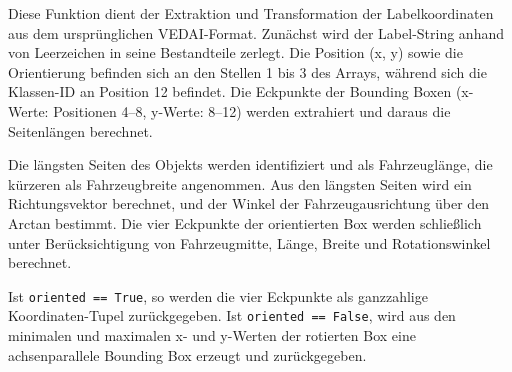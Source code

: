 Diese Funktion dient der Extraktion und Transformation der Labelkoordinaten aus dem ursprünglichen \acrshort{VEDAI}-Format. Zunächst wird der Label-String anhand von Leerzeichen in seine Bestandteile zerlegt. Die Position (x, y) sowie die Orientierung befinden sich an den Stellen 1 bis 3 des Arrays, während sich die Klassen-\acrshort{ID} an Position 12 befindet. Die Eckpunkte der Bounding Boxen (x-Werte: Positionen 4–8, y-Werte: 8–12) werden extrahiert und daraus die Seitenlängen berechnet.

Die längsten Seiten des Objekts werden identifiziert und als Fahrzeuglänge, die kürzeren als Fahrzeugbreite angenommen. Aus den längsten Seiten wird ein Richtungsvektor berechnet, und der Winkel der Fahrzeugausrichtung über den Arctan bestimmt. Die vier Eckpunkte der orientierten Box werden schließlich unter Berücksichtigung von Fahrzeugmitte, Länge, Breite und Rotationswinkel berechnet.

Ist \lstinline|oriented == True|, so werden die vier Eckpunkte als ganzzahlige Koordinaten-Tupel zurückgegeben. Ist \lstinline|oriented == False|, wird aus den minimalen und maximalen x- und y-Werten der rotierten Box eine achsenparallele Bounding Box erzeugt und zurückgegeben.

